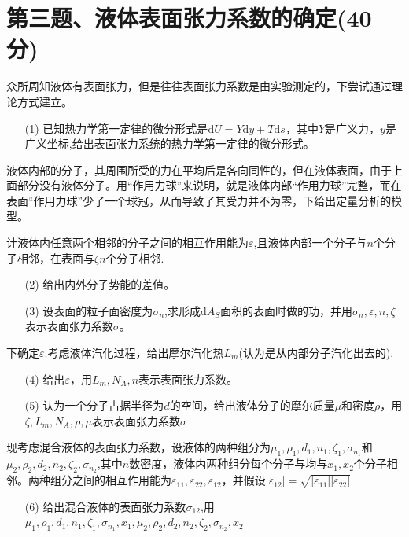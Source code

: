 \documentclass{article}
\begin{document}
\section*{第三题、液体表面张力系数的确定(40分)}
众所周知液体有表面张力，但是往往表面张力系数是由实验测定的，下尝试通过理论方式建立。\par
\begin{itemize}
\item[(1)]已知热力学第一定律的微分形式是$\mathrm{d}U=Y\mathrm{d}y+T\mathrm{d}s$，其中$Y$是广义力，$y$是广义坐标,给出表面张力系统的热力学第一定律的微分形式。
\end{itemize}\par
液体内部的分子，其周围所受的力在平均后是各向同性的，但在液体表面，由于上面部分没有液体分子。用“作用力球”来说明，就是液体内部“作用力球”完整，而在表面“作用力球”少了一个球冠，从而导致了其受力并不为零，下给出定量分析的模型。\par
计液体内任意两个相邻的分子之间的相互作用能为$\varepsilon$,且液体内部一个分子与$n$个分子相邻，在表面与$\zeta n$个分子相邻.
\begin{itemize}
\item[(2)]给出内外分子势能的差值。
\item[(3)]设表面的粒子面密度为$\sigma_n$,求形成$\mathrm{d}A_S$面积的表面时做的功，并用$\sigma_n,\varepsilon,n,\zeta$表示表面张力系数$\sigma$。\par
\end{itemize}
\par
下确定$\varepsilon$.考虑液体汽化过程，给出摩尔汽化热$L_m$(认为是从内部分子汽化出去的).
\begin{itemize}
\item[(4)]给出$\varepsilon$，用$L_m,N_A,n$表示表面张力系数。
\item[(5)]认为一个分子占据半径为$d$的空间，给出液体分子的摩尔质量$\mu$和密度$\rho$，用$\zeta,L_m,N_A,\rho,\mu$表示表面张力系数$\sigma$ 
\end{itemize}
\par
现考虑混合液体的表面张力系数，设液体的两种组分为$\mu_1,\rho_1,d_1,n_1,\zeta_1,\sigma_{n_1}$和$\mu_2,\rho_2,d_2,n_2,\zeta_2,\sigma_{n_2}$,其中$n$数密度，液体内两种组分每个分子与均与$x_1,x_2$个分子相邻。两种组分之间的相互作用能为$\varepsilon_{11},\varepsilon_{22},\varepsilon_{12}$，并假设$|\varepsilon_{12}|=\sqrt{|\varepsilon_{11}||\varepsilon_{22}|}$
\begin{itemize}
\item[(6)]给出混合液体的表面张力系数$\sigma_{12}$,用$\mu_1,\rho_1,d_1,n_1,\zeta_1,\sigma_{n_1},x_1,\mu_2,\rho_2,d_2,n_2,\zeta_2,\sigma_{n_2},x_2$
\end{itemize}
\end{document}
